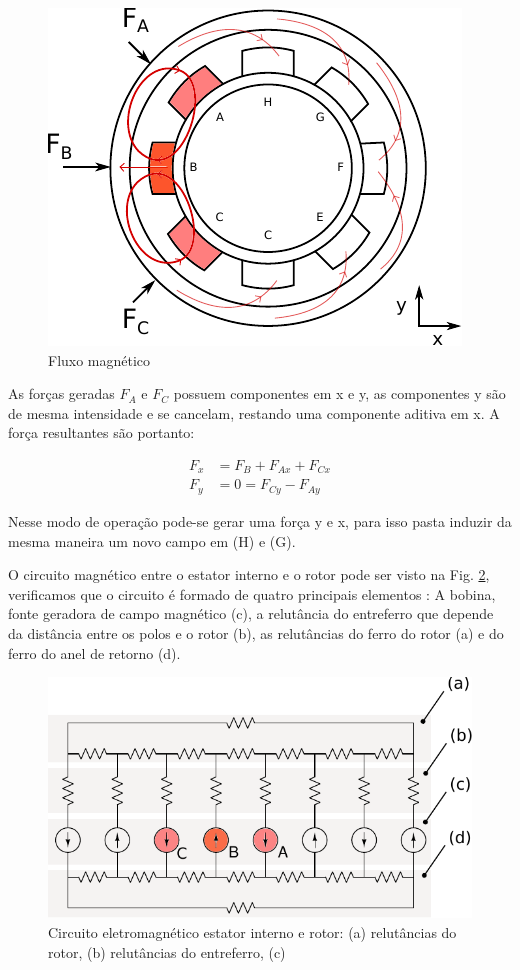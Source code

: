 \begin{figure}[ht!]
	\centering
	\includegraphics[width=0.7\linewidth]{./Figs/modelo_mancal_estator_interno_fluxo}
	\caption{Fluxo magnético}
	\label{fig:modelo:mancal:estator:interno:fluxo}
\end{figure}

As forças geradas $F_A$ e $F_C$ possuem componentes em x e y, as componentes y são de mesma intensidade e se cancelam, restando uma componente aditiva em x. A força resultantes são portanto:

\begin{align}
 	F_x &= F_B + F_{Ax} + F_{Cx} \\
 	F_y &= 0 = F_{Cy} - F_{Ay} 
\end{align}


Nesse modo de operação pode-se gerar uma força y e x, para isso pasta induzir da mesma maneira um novo campo em (H) e (G). 

O circuito magnético entre o estator interno e o rotor pode ser visto na Fig. \ref{fig:modelo:circuito:ativo:explicativo}, verificamos que o circuito é formado de quatro principais elementos : A bobina, fonte geradora de campo magnético (c), a relutância do entreferro que depende da distância entre os polos e o rotor (b), as relutâncias do ferro do rotor (a) e do ferro do anel de retorno (d).

\begin{figure}[ht!]
\centering
\includegraphics[width=0.7\linewidth]{./Figs/modelo_circuito_ativo_explicativo}
\caption[Circuito eletromagnético estator interno e rotor]{Circuito eletromagnético estator interno e rotor: (a) relutâncias do rotor, (b) relutâncias do entreferro, (c) }
\label{fig:modelo:circuito:ativo:explicativo}
\end{figure}

